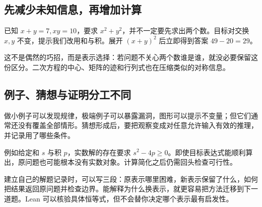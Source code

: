 \subsection*{先减少未知信息，再增加计算}
已知 $x+y=7,xy=10$，要求 $x^2+y^2$，并不一定要先求出两个数。目标对交换 $x,y$ 不变，提示我们改用和与积。展开 $(x+y)^2$ 后立即得到答案 $49-20=29$。

这不是偶然的巧招，而是表示选择：若问题不关心两个数谁是谁，就没必要保留这份区分。二次方程的中心、矩阵的迹和行列式也在压缩类似的对称信息。

\subsection*{例子、猜想与证明分工不同}
做小例子可以发现规律，极端例子可以暴露漏洞，图形可以提示不变量；但它们通常还没有覆盖全部情形。猜想形成后，要把观察变成对任意允许输入有效的推理，并记录用了哪些条件。

例如给定和 $s$ 与积 $p$，实数解的存在要求 $s^2-4p\ge0$。即使目标表达式能顺利算出，原问题也可能根本没有实数对象。计算简化之后仍需回头检查可行性。

建立自己的解题记录时，可以写三段：原表示哪里困难，新表示保留了什么，如何把结果返回原问题并检查边界。能解释为什么换表示，就更容易把方法迁移到下一道题。Lean 可以核验具体恒等式，但不会替你决定哪个表示最有启发性。
